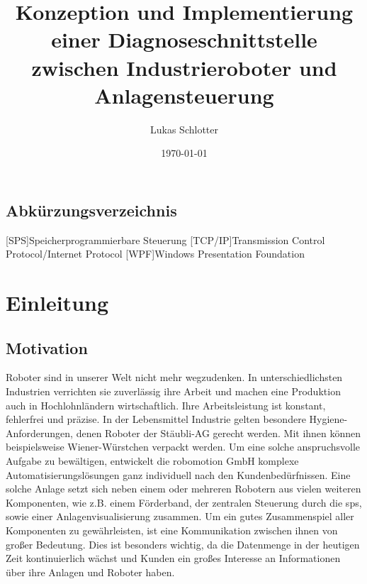 \documentclass[ a4paper,
                oneside,
                toc=bibliography,
                toc=listof
                ]{scrbook}
\author{Lukas Schlotter}
\title{Konzeption und Implementierung einer Diagnoseschnittstelle zwischen Industrieroboter und Anlagensteuerung}
\date{\today}
\begin{document}
 
    \frontmatter
    \makeISWtitle
    
    \cleardoublepage
	\setcounter{page}{1} %

    
    \cleardoublepage
    \tableofcontents
    
  
    \section*{Abkürzungsverzeichnis}
    \begin{acronym}[TCP/IP]
    	[SPS]{Speicherprogrammierbare Steuerung}
    	[TCP/IP]{Transmission Control Protocol/Internet Protocol}
    	[WPF]{Windows Presentation Foundation}
    \end{acronym}

    \mainmatter
    
    \chapter{Einleitung}

    \section{Motivation}
    Roboter sind in unserer Welt nicht mehr wegzudenken. In unterschiedlichsten Industrien verrichten sie zuverlässig ihre Arbeit und machen eine Produktion auch in Hochlohnländern wirtschaftlich. Ihre Arbeitsleistung ist konstant, fehlerfrei und präzise. In der Lebensmittel Industrie gelten besondere Hygiene-Anforderungen, denen Roboter der \glqq Stäubli-AG\grqq{} gerecht werden. Mit ihnen können beispielsweise Wiener-Würstchen verpackt werden. Um eine solche anspruchsvolle Aufgabe zu bewältigen, entwickelt die \glqq robomotion GmbH\grqq{} komplexe Automatisierungslösungen ganz individuell nach den Kundenbedürfnissen. Eine solche Anlage setzt sich neben einem oder mehreren Robotern aus vielen weiteren Komponenten, wie z.B. einem Förderband, der zentralen Steuerung durch die \ac{sps}, sowie einer Anlagenvisualisierung zusammen. Um ein gutes Zusammenspiel aller Komponenten zu gewährleisten, ist eine Kommunikation zwischen ihnen von großer Bedeutung. Dies ist besonders wichtig, da die Datenmenge in der heutigen Zeit kontinuierlich wächst und Kunden ein großes Interesse an Informationen über ihre Anlagen und Roboter haben.
\end{document}
